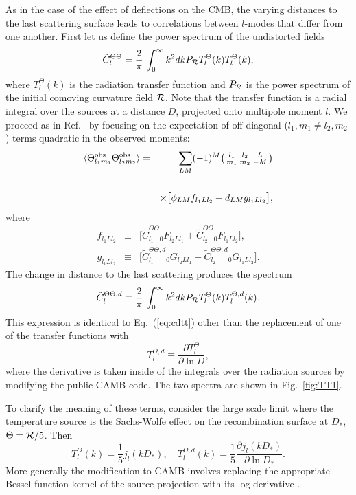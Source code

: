 \documentclass[prd,amsmath,amssymb,floatfix,superscriptaddress,nofootinbib,twocolumn]{revtex4-1}
\def\be{\begin{equation}}
\def\ee{\end{equation}}
\def\bea{\begin{eqnarray}}
\def\eea{\end{eqnarray}}
\newcommand{\vs}{\nonumber\\}
\newcommand{\ec}[1]{Eq.~(\ref{eq:#1})}
\newcommand{\eql}[1]{\label{eq:#1}}
\newcommand{\rf}[1]{\ref{fig:#1}}
\begin{document}
As in the case of the effect of deflections on the CMB, the varying distances to the last scattering surface leads to correlations between $l$-modes that differ from one another. 
First let us define the power spectrum of the undistorted fields
\begin{equation}
\tilde C_l^{\Theta\Theta} =  \frac{2}{\pi}\,\int_0^\infty k^2 dk P_{\cal R} T_l^ \Theta(k)T_l^ \Theta(k),
\eql{cdtt}
\end{equation}
where $T_l^\Theta(k)$ is the radiation transfer function and $P_{\cal R}$ is the  power spectrum of the initial comoving curvature field ${\cal R}$.  Note that the transfer function is a radial integral over
the sources at a distance $D$, projected onto multipole moment $l$.
We proceed as in Ref.~\cite{Hu:2001tn} by focusing on the expectation of off-diagonal (${l_1,m_1\ne l_2,m_2}$) terms quadratic in the observed moments:
\bea
\langle \tob_{l_1m_1} \tob_{l_2m_2} \rangle &=& \sum_{LM}  (-1)^M \bigl(\begin{smallmatrix} l_1 & l_2 & L \\ m_1 & m_2 & -M  \end{smallmatrix}\bigr) \nonumber \\
\vs&&\times\big[ \phi_{LM}f_{l_{1}Ll_{2}} + d_{LM}g_{l_{1}Ll_{2}} \big] ,  \eql{quad}
\eea
where
\bea
f_{l_1Ll_2} &\equiv& \big[ \tilde{C}_{l_{1}}^{\Theta\Theta} {}_{0}F_{l_{2}Ll_{1}} +\tilde{C}_{l_{2}}^{\Theta\Theta} {}_{0}F_{l_{1}Ll_{2}}\big],
\vs
g_{l_1Ll_2} &\equiv&\big[ \tilde{C}_{l_{1}}^{\Theta\Theta,d} {}_{0}G_{l_{2}Ll_{1}} +\tilde{C}_{l_{2}}^{\Theta \Theta,d} {}_{0}G_{l_{1}Ll_{2}}\big].\eql{lfg}
\eea
The change in distance to the last scattering  produces the spectrum
\be
\tilde{C}^{\Theta\Theta,d}_{l} \equiv \frac{2}{\pi}\,\int_0^\infty  k^2 dk P_{\cal R} T_l^\Theta(k) 
T_l^{\Theta,d}(k).
\eql{cld}
\ee
This expression is identical to \ec{cdtt} other than the replacement of one of the transfer functions with 
\begin{equation}
T_l^{\Theta,d} \equiv \frac{\partial T_l^\Theta}{\partial \ln D},
\end{equation}
where the derivative is taken inside of the integrals over the radiation sources by modifying
the public CAMB code. 
The two spectra are shown in Fig.~\rf{TT1}. 

To clarify the meaning of these terms, consider the large scale limit where the temperature
source is the Sachs-Wolfe effect on the recombination surface at $D_*$, 
 $\Theta = {\cal R}/5$.   Then
 \begin{equation}
 T_l^\Theta(k) = \frac{1}{5} j_l(k D_*), \quad  T_l^{\Theta,d} (k) = \frac{1}{5}
 \frac{\partial j_l(k D_*)}{\partial \ln D_*}.
\end{equation}
More generally the modification to CAMB involves replacing the appropriate Bessel function kernel of
the source projection with its log derivative \cite{Hu:2001yq}.
\end{document}
